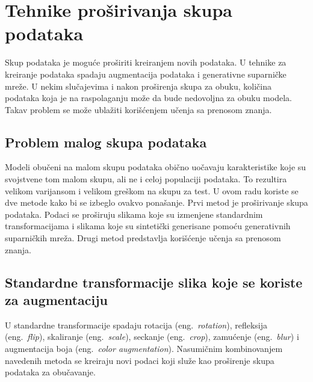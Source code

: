 \documentclass[12pt,oneside]{memoir}
\begin{document}
\chapter{Tehnike proširivanja skupa podataka}
\label{section3}

Skup podataka je moguće proširiti kreiranjem novih podataka. U tehnike za kreiranje podataka spadaju augmentacija podataka i generativne suparničke mreže. U nekim slučajevima i nakon proširenja skupa za obuku, količina podataka koja je na raspolaganju može da bude nedovoljna za obuku modela. Takav problem se može ublažiti korišćenjem učenja sa prenosom znanja. 



\section{Problem malog skupa podataka}

Modeli obučeni na malom skupu podataka obično uočavaju karakteristike koje su svojstvene tom malom skupu, ali ne i celoj populaciji podataka. To rezultira velikom varijansom i velikom greškom na skupu za test. U ovom radu koriste se dve metode kako bi se izbeglo ovakvo ponašanje. Prvi metod je proširivanje skupa podataka.
Podaci se proširuju slikama koje su izmenjene standardnim transformacijama i slikama koje su sintetički generisane pomoću generativnih suparničkih mreža.
Drugi metod predstavlja korišćenje učenja sa prenosom znanja.


\section{Standardne transformacije slika koje se koriste za augmentaciju}
\label{section3_increasedata_bas}
U standardne transformacije spadaju rotacija (eng.~\textit{rotation}), refleksija (eng.~\textit{flip}), skaliranje (eng.~\textit{scale}), seckanje (eng.~\textit{crop}), zamućenje (eng.~\textit{blur}) i augmentacija boja (eng.~\textit{color augmentation}).
Nasumičnim kombinovanjem navedenih metoda se kreiraju novi podaci koji služe kao proširenje skupa podataka za obučavanje. 
\end{document}
